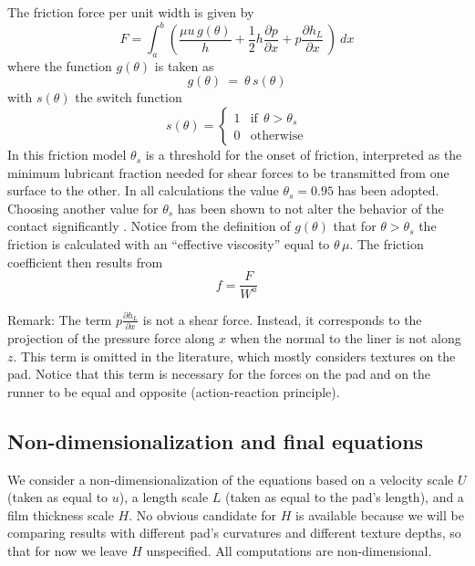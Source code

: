 The friction force per unit width is given by
\begin{equation}
F = \int_a^{b}
\left ( \frac{\mu u\,g(\theta)}{h}+\frac{1}{2}h\frac{\partial p}{\partial x} + p\frac{\partial h_{L}}{\partial x}
 \,\right ) ~dx
\end{equation}
where the function $g(\theta)$ is taken as 
\begin{equation}
g(\theta) ~=~\theta\,s(\theta)
\end{equation}
with $s(\theta)$ the switch function 
\begin{equation}
s(\theta) = \left \{ \begin{array}{ll}
1 & \mbox{if}~~\theta > \theta_s \\
0 & \mbox{otherwise} \end{array}\right.
\end{equation}
In this friction model $\theta_s$ is a threshold for the onset
of friction, interpreted as the minimum lubricant fraction needed
for shear
forces to be transmitted from one surface to the other. In all
calculations the value $\theta_s = 0.95$ has been adopted. Choosing
another value for $\theta_s$ has been shown to not alter
the behavior of the contact significantly \cite{checo13}. Notice
from the definition of $g(\theta)$
that for $\theta > \theta_s$ the friction is calculated with
an ``effective viscosity'' equal to $\theta\,\mu$.
The friction coefficient then results from
\begin{equation}
f = \frac{F}{W^{a}}
\end{equation}

Remark: The term $p \frac{\partial h_L}{\partial x}$ is not a shear
force. Instead, it corresponds to
the projection of the pressure force along $x$ when the normal to the
liner is not along $z$. This term is omitted in the
literature, which mostly considers textures on the pad. Notice that
this term is necessary for the forces on the pad and on the runner
to be equal and opposite (action-reaction principle).


\subsection{Non-dimensionalization and final equations}

We consider a non-dimensionalization of the equations based on a
velocity scale $U$ (taken as equal to $u$), a length scale
$L$ (taken as equal to the pad's length), and a film thickness
scale $H$. No obvious candidate for $H$ is available because we will be 
comparing results with different pad's curvatures and different
texture depths, so that for now we leave $H$ unspecified. All computations are
non-dimensional.

